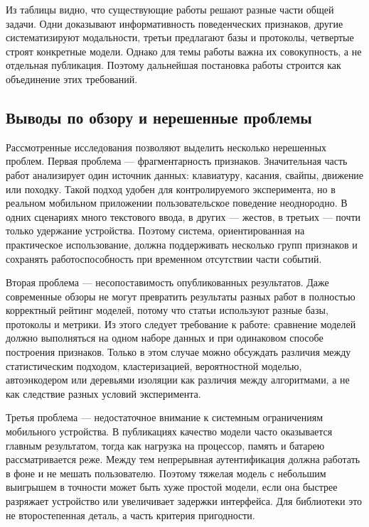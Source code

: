 \documentclass[oneside,senior,etd]{BYUPhys}
\begin{document}
Из таблицы видно, что существующие работы решают разные части общей задачи. Одни доказывают информативность поведенческих признаков, другие систематизируют модальности, третьи предлагают базы и протоколы, четвертые строят конкретные модели. Однако для темы работы важна их совокупность, а не отдельная публикация. Поэтому дальнейшая постановка работы строится как объединение этих требований.

\subsection{Выводы по обзору и нерешенные проблемы}

Рассмотренные исследования позволяют выделить несколько нерешенных проблем. Первая проблема --- фрагментарность признаков. Значительная часть работ анализирует один источник данных: клавиатуру, касания, свайпы, движение или походку. Такой подход удобен для контролируемого эксперимента, но в реальном мобильном приложении пользовательское поведение неоднородно. В одних сценариях много текстового ввода, в других --- жестов, в третьих --- почти только удержание устройства. Поэтому система, ориентированная на практическое использование, должна поддерживать несколько групп признаков и сохранять работоспособность при временном отсутствии части событий.

Вторая проблема --- несопоставимость опубликованных результатов. Даже современные обзоры не могут превратить результаты разных работ в полностью корректный рейтинг моделей, потому что статьи используют разные базы, протоколы и метрики. Из этого следует требование к работе: сравнение моделей должно выполняться на одном наборе данных и при одинаковом способе построения признаков. Только в этом случае можно обсуждать различия между статистическим подходом, кластеризацией, вероятностной моделью, автоэнкодером или деревьями изоляции как различия между алгоритмами, а не как следствие разных условий эксперимента.

Третья проблема --- недостаточное внимание к системным ограничениям мобильного устройства. В публикациях качество модели часто оказывается главным результатом, тогда как нагрузка на процессор, память и батарею рассматривается реже. Между тем непрерывная аутентификация должна работать в фоне и не мешать пользователю. Поэтому тяжелая модель с небольшим выигрышем в точности может быть хуже простой модели, если она быстрее разряжает устройство или увеличивает задержки интерфейса. Для библиотеки это не второстепенная деталь, а часть критерия пригодности.
\end{document}
